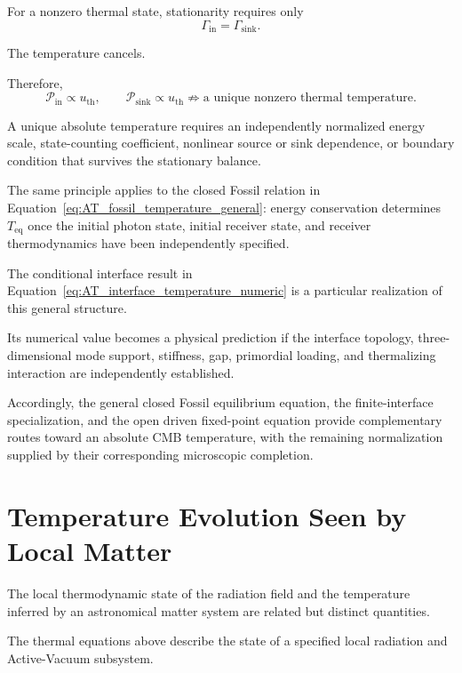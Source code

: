For a nonzero thermal state, stationarity requires only
\begin{equation}
    \Gamma_{\mathrm{in}}
    =
    \Gamma_{\mathrm{sink}}.
    \label{eq:AT_proportional_rate_equality}
\end{equation}

The temperature cancels.

Therefore,
\begin{equation}
    \mathcal P_{\mathrm{in}}
    \propto
    u_{\mathrm{th}},
    \qquad
    \mathcal P_{\mathrm{sink}}
    \propto
    u_{\mathrm{th}}
    \not\Rightarrow
    \text{a unique nonzero thermal temperature}.
    \label{eq:AT_temperature_normalization_no_go}
\end{equation}

A unique absolute temperature requires an independently normalized energy
scale, state-counting coefficient, nonlinear source or sink dependence, or
boundary condition that survives the stationary balance.

The same principle applies to the closed Fossil relation in
Equation~\eqref{eq:AT_fossil_temperature_general}:
energy conservation determines
\(T_{\mathrm{eq}}\)
once the initial photon state, initial receiver state, and receiver
thermodynamics have been independently specified.

The conditional interface result in
Equation~\eqref{eq:AT_interface_temperature_numeric}
is a particular realization of this general structure.

Its numerical value becomes a physical prediction if the interface topology,
three-dimensional mode support, stiffness, gap, primordial loading, and
thermalizing interaction are independently established.

Accordingly, the general closed Fossil equilibrium equation, the
finite-interface specialization, and the open driven fixed-point equation
provide complementary routes toward an absolute CMB temperature, with the
remaining normalization supplied by their corresponding microscopic
completion.


\section{Temperature Evolution Seen by Local Matter}

The local thermodynamic state of the radiation field and the temperature
inferred by an astronomical matter system are related but distinct
quantities.

The thermal equations above describe the state of a specified local radiation
and Active-Vacuum subsystem.

